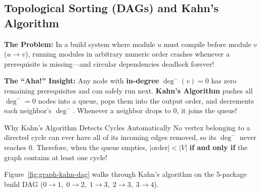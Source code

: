 \documentclass[11pt,a4paper]{article}
\theoremstyle{definition}
\newcommand{\painbeat}{\textbf{\color{accentamber}The Problem:} }
\newcommand{\ahabeat}{\textbf{\color{accentteal}The ``Aha!'' Insight:} }
\begin{document}
\subsection{Topological Sorting (DAGs) and Kahn's Algorithm}

\painbeat In a build system where module $u$ must compile before module $v$ ($u \to v$), running modules in arbitrary numeric order crashes whenever a prerequisite is missing---and circular dependencies deadlock forever!

\ahabeat Any node with \textbf{in-degree} $\deg^-(v) = 0$ has zero remaining prerequisites and can safely run next. \textbf{Kahn's Algorithm} pushes all $\deg^- = 0$ nodes into a queue, pops them into the output order, and decrements each neighbor's $\deg^-$. Whenever a neighbor drops to $0$, it joins the queue!

\begin{calloutbox}{Why Kahn's Algorithm Detects Cycles Automatically}
No vertex belonging to a directed cycle can ever have all of its incoming edges removed, so its $\deg^-$ never reaches $0$. Therefore, when the queue empties, $|\text{order}| < |V|$ \textbf{if and only if} the graph contains at least one cycle!
\end{calloutbox}

Figure~\ref{fig:graph-kahn-dag} walks through Kahn's algorithm on the 5-package build DAG ($0 \to 1,\; 0 \to 2,\; 1 \to 3,\; 2 \to 3,\; 3 \to 4$).
\end{document}
